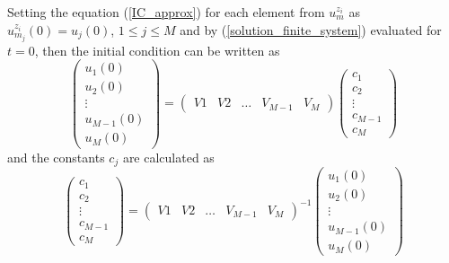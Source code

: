     \noindent Setting the equation (\ref{IC_approx}) for each element from $u^{z_i}_m$ as $u^{z_i}_{m_j} (0) = u_j (0)$, $1 \leq j \leq M$ and by (\ref{solution_finite_system}) evaluated for $t=0$, then the initial condition can be written as
    \begin{equation*}	
	    \begin{pmatrix}
	    u_1 (0) \\ u_2 (0) \\ \vdots \\ u_{M-1} (0) \\	u_M (0)
	    \end{pmatrix}
	    = 
	    \begin{pmatrix}
	    V1 & V2 & \dots & V_{M-1} & V_M
	    \end{pmatrix}
	    \begin{pmatrix}
	    c_1 \\ c_2 \\ \vdots \\ c_{M-1} \\ c_M
	    \end{pmatrix}
    \end{equation*}
    and the constants $c_j$ are calculated as
    \begin{equation*}
    	\begin{pmatrix}
    	c_1 \\ c_2 \\ \vdots \\ c_{M-1} \\ c_M 
    	\end{pmatrix}
    	=	
    	\begin{pmatrix}
    	V1 & V2 & \dots & V_{M-1} & V_M
    	\end{pmatrix}^{-1}
	    \begin{pmatrix}
	    u_1 (0) \\ u_2 (0) \\ \vdots \\ u_{M-1} (0) \\	u_M (0)
	    \end{pmatrix}
    \end{equation*}
    

